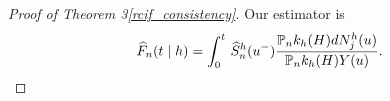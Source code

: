 { %
\newcommand{\shat}{\survnhat\argtleft}
\newcommand{\strue}{\truehsurv\argtleft}
\newcommand{\kdnj}{\kernel\argH d\Nj\argt}
\newcommand{\knj}{\kernel\argH \Nj\argt}
\newcommand{\ky}{\kernel\argH \atrisk \argt}
\newcommand{\tmpone}{\strue
\frac{\PnP \kdnj}{\Pn \ky}}

\newcommand{\rn}{r_n}
\newcommand{\thetanHAT}{\widehat{\theta}_n}
\newcommand{\truetheta}{\theta_0}
\newcommand{\fthat}{f(\thetanHAT)}
\newcommand{\fttrue}{f(\truetheta)}
\newcommand{\thetadiff}{(\thetanHAT - \truetheta)}
\newcommand{\fdot}{\dot{f}_{\truetheta}}
\newcommand{\fdotlong}{\dot{f}_{\truetheta + t(\thetanHAT-\truetheta)}}
\begin{proof}[Proof of Theorem \ifnum{} 3\else \ref{rcif_consistency}\fi]

\newcommand{\fracPn}{\frac{\PnkH d\Nj\argu}{\PnkH \atrisk\argu}}
\newcommand{\frachPn}{\frac{\PnkH d\Nj^\histlower\argu}{\PnkH \atrisk\argu}}

Our estimator is 
\begin{align*}
\AJhat\argtgh=\intzerotot \survnhhat\arguleft \frachPn.
\end{align*}


\end{proof}}
